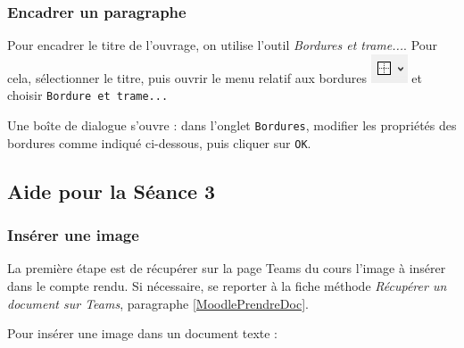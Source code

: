 \subsubsection{Encadrer un paragraphe} 

Pour encadrer le titre de l'ouvrage, on utilise l'outil \emph{Bordures et trame...}. Pour cela, sélectionner le titre, puis ouvrir le menu relatif aux bordures \includegraphics[scale=0.6]{././images/texte/iconeBordure.png} et choisir \texttt{Bordure et trame...}


Une boîte de dialogue s'ouvre : dans l'onglet \texttt{Bordures}, modifier les propriétés des bordures comme indiqué ci-dessous, puis cliquer sur \texttt{OK}.





%
%
%
%


\subsection{Aide pour la Séance 3}\label{correction_texte03}



\subsubsection{Insérer une image}

La première étape est de récupérer sur la page Teams du cours l'image à insérer dans le compte rendu. Si nécessaire, se reporter à la fiche méthode \emph{Récupérer un document sur Teams}, paragraphe \vref{MoodlePrendreDoc}.

\vspace{12pt}

Pour insérer une image dans un document texte :

